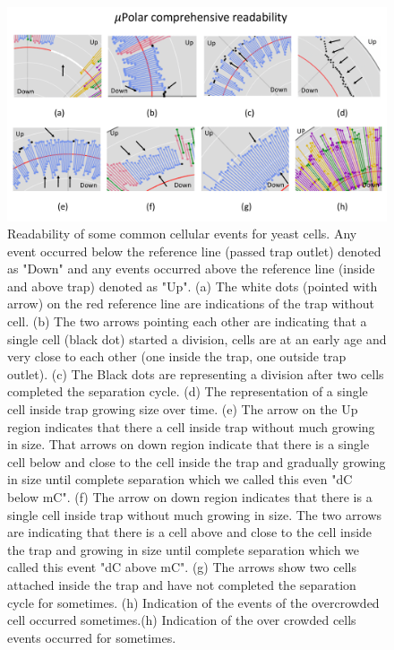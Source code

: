 \documentclass[conference]{IEEEtran}
\begin{document}
\begin{figure}
\centering
\includegraphics[width=\textwidth,height=10 cm]{Patterns/read.pdf}
\caption{Readability of some common cellular events for yeast cells. Any event occurred below the reference line (passed trap outlet) denoted as "Down" and any events occurred above the reference line (inside and above trap) denoted as "Up". (a) The white dots (pointed with arrow) on the red reference line are indications of the trap without cell. (b) The two arrows pointing each other are indicating that a single cell (black dot) started a division, cells are at an early age and very close to each other (one inside the trap, one outside trap outlet). (c) The Black dots are representing a division after two cells completed the separation cycle. (d) The representation of a single cell inside trap growing size over time. (e) The arrow on the Up region indicates that there a cell inside trap without much growing in size. That arrows on down region indicate that there is a single cell below and close to the cell inside the trap and gradually growing in size until complete separation which we called this even "dC below mC". (f) The arrow on down region indicates that there is a single cell inside trap without much growing in size. The two arrows are indicating that there is a cell above and close to the cell inside the trap and growing in size until complete separation which we called this event "dC above mC". (g) The arrows show two cells attached inside the trap and have not completed the separation cycle for sometimes. (h) Indication of the events of the overcrowded cell occurred sometimes.(h) Indication of the over crowded cells events occurred for sometimes.}

\label{fig:explain}
\end{figure}
\end{document}
